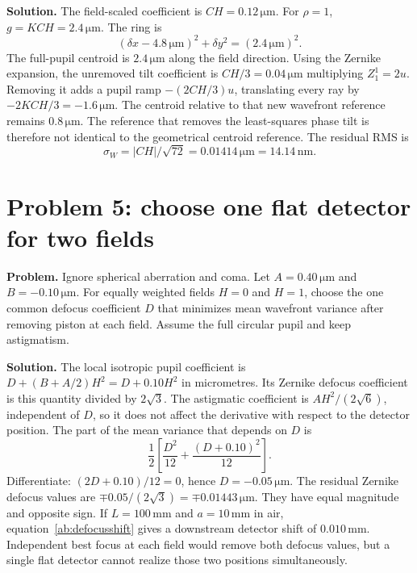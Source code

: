 \textbf{Solution.} The field-scaled coefficient is $CH=0.12\,\mathrm{\mu m}$.
For $\rho=1$, $g=KCH=2.4\,\mathrm{\mu m}$. The ring is
\begin{equation}
 (\delta x-4.8\,\mathrm{\mu m})^2+\delta y^2
       =(2.4\,\mathrm{\mu m})^2.
\end{equation}
The full-pupil centroid is $2.4\,\mathrm{\mu m}$ along the field direction.
Using the Zernike expansion, the unremoved tilt coefficient is
$CH/3=0.04\,\mathrm{\mu m}$ multiplying $Z_1^1=2u$.
Removing it adds a pupil ramp $-(2CH/3)u$, translating every ray by
$-2KCH/3=-1.6\,\mathrm{\mu m}$. The centroid relative to that new
wavefront reference remains $0.8\,\mathrm{\mu m}$. The reference that
removes the least-squares phase tilt is therefore not identical to the
geometrical centroid reference. The residual RMS is
\begin{equation}
 \sigma_W=|CH|/\sqrt{72}=0.01414\,\mathrm{\mu m}=14.14\,\mathrm{nm}.
\end{equation}

\section{Problem 5: choose one flat detector for two fields}
\textbf{Problem.} Ignore spherical aberration and coma. Let
$A=0.40\,\mathrm{\mu m}$ and $B=-0.10\,\mathrm{\mu m}$. For equally
weighted fields $H=0$ and $H=1$, choose the one common defocus coefficient
$D$ that minimizes mean wavefront variance after removing piston at each
field. Assume the full circular pupil and keep astigmatism.

\textbf{Solution.} The local isotropic pupil coefficient is
$D+(B+A/2)H^2=D+0.10H^2$ in micrometres. Its Zernike defocus coefficient
is this quantity divided by $2\sqrt3$. The astigmatic coefficient is
$AH^2/(2\sqrt6)$, independent of $D$, so it does not affect the derivative
with respect to the detector position. The part of the mean variance that
depends on $D$ is
\begin{equation}
 \frac12\left[\frac{D^2}{12}
                  +\frac{(D+0.10)^2}{12}\right].
\end{equation}
Differentiate: $(2D+0.10)/12=0$, hence
$D=-0.05\,\mathrm{\mu m}$. The residual Zernike defocus values are
$\mp0.05/(2\sqrt3)=\mp0.01443\,\mathrm{\mu m}$. They have equal
magnitude and opposite sign. If $L=100\,\mathrm{mm}$ and $a=10\,\mathrm{mm}$
in air, equation~\eqref{ab:defocusshift} gives a downstream detector shift
of $0.010\,\mathrm{mm}$. Independent best focus at each field would remove
both defocus values, but a single flat detector cannot realize those two
positions simultaneously.

